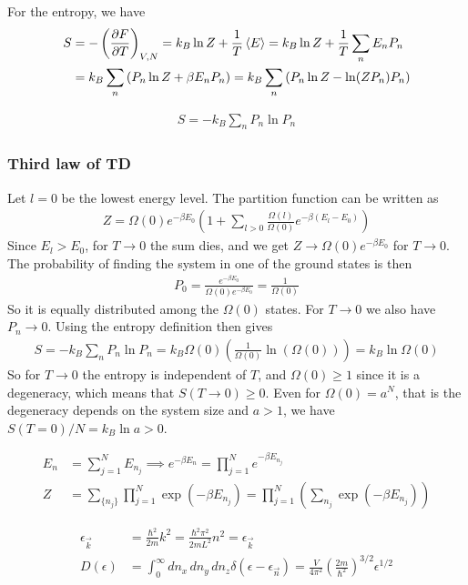 \documentclass[a4paper, english, 12pt]{article}
\newcommand{\closed}[1]{\left( #1 \right)}
\newcommand{\curly}[1]{\{ #1 \} }
\begin{document}
\begin{multicols*}{2}
For the entropy, we have 
\begin{align*}
    S&=-\closed{\pdv{F}{T}}_{V,N} = k_B \ln Z + \frac{1}{T}\expval{E} = k_B \ln Z + \frac{1}{T}\sum_n E_n P_n \\ 
    &= k_B \sum_n \closed{P_n \ln Z + \beta E_n P_n} = k_B \sum_n \closed{P_n \ln Z - \ln(ZP_n) P_n}
\end{align*}


\begin{align*}
    S = -k_B \sum_n P_n \ln P_n
\end{align*}

\subsubsection*{\scriptsize Third law of TD}
Let $l=0$ be the lowest energy level. The partition function can be written as 
\begin{align*}
    Z = \Omega(0)e^{-\beta E_0} \closed{1 + \sum_{l>0} \frac{\Omega(l)}{\Omega(0)} e^{-\beta(E_l-E_0)} }    
\end{align*}
Since $E_l>E_0$, for $T\to0$ the sum dies, and we get $Z \to \Omega(0) e^{-\beta E_0}$ for $T\to0$. The probability of finding the system in one of the ground states is then 
\begin{align*}
    P_0 = \frac{e^{-\beta E_0}}{\Omega(0)e^{-\beta E_0}} = \frac{1}{\Omega(0)}
\end{align*}
So it is equally distributed among the $\Omega(0)$ states. For $T\to0$ we also have $P_n\to0$. Using the entropy definition then gives 
\begin{align*}
    S = -k_B \sum_n P_n \ln P_n = k_B \Omega(0) \closed{\frac{1}{\Omega(0)}\ln(\Omega(0))} = k_B \ln\Omega(0)
\end{align*}
So for $T\to0$ the entropy is independent of $T$, and $\Omega(0)\geq1$ since it is a degeneracy, which means that $S(T\to0)\geq0$. Even for $\Omega(0)=a^N$, that is the degeneracy depends on the system size and $a>1$, we have $S(T=0)/N=k_B \ln a>0$. 

\begin{align*}
    E_n &= \sum_{j=1}^N E_{n_j} \implies e^{-\beta E_n} = \prod_{j=1}^N e^{-\beta E_{n_j}} \\
    Z &= \sum_{\curly{n_j}} \prod_{j=1}^N \exp(-\beta E_{n_j}) = \prod_{j=1}^N \left( \sum_{n_j} \exp(-\beta E_{n_j}) \right)
\end{align*}

\begin{align*}
    \epsilon_{\vec{k}} &= \frac{\hbar^2 }{2m}k^2 = \frac{\hbar^2 \pi^2}{2mL^2}n^2 = \epsilon_{\vec{k}} \\ 
    D(\epsilon) &= \int_0^\infty dn_x\,dn_y\,dn_z \delta(\epsilon-\epsilon_{\vec{n}}) = \frac{V}{4\pi^2} \left(\frac{2m}{\hbar^2}\right)^{3/2} \epsilon^{1/2}
\end{align*}



\end{multicols*}
\end{document}
